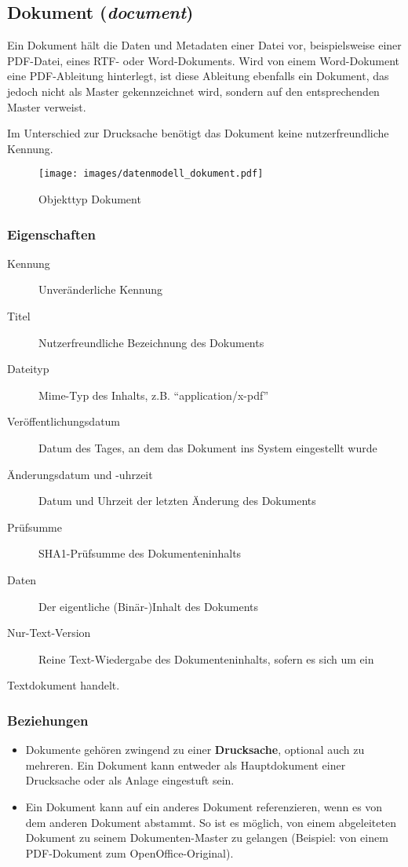 \documentclass[,a4paper]{article}
\makeatletter
\def\maxwidth{\ifdim\Gin@nat@width>\linewidth\linewidth
\else\Gin@nat@width\fi}
\let\Oldincludegraphics\includegraphics
\renewcommand{\includegraphics}[1]{\Oldincludegraphics[width=\maxwidth]{#1}}
\makeatother
\begin{document}
\subsection{Dokument (\emph{document})}

Ein Dokument hält die Daten und Metadaten einer Datei vor,
beispielsweise einer PDF-Datei, eines RTF- oder Word-Dokuments. Wird von
einem Word-Dokument eine PDF-Ableitung hinterlegt, ist diese Ableitung
ebenfalls ein Dokument, das jedoch nicht als Master gekennzeichnet wird,
sondern auf den entsprechenden Master verweist.

Im Unterschied zur Drucksache benötigt das Dokument keine
nutzerfreundliche Kennung.

\begin{figure}[htbp]
\centering
\texttt{[image: images/datenmodell\_dokument.pdf]}
\caption{Objekttyp Dokument}
\end{figure}

\subsubsection{Eigenschaften}

\begin{description}
\item[Kennung]
Unveränderliche Kennung
\item[Titel]
Nutzerfreundliche Bezeichnung des Dokuments
\item[Dateityp]
Mime-Typ des Inhalts, z.B. ``application/x-pdf''
\item[Veröffentlichungsdatum]
Datum des Tages, an dem das Dokument ins System eingestellt wurde
\item[Änderungsdatum und -uhrzeit]
Datum und Uhrzeit der letzten Änderung des Dokuments
\item[Prüfsumme]
SHA1-Prüfsumme des Dokumenteninhalts
\item[Daten]
Der eigentliche (Binär-)Inhalt des Dokuments
\item[Nur-Text-Version]
Reine Text-Wiedergabe des Dokumenteninhalts, sofern es sich um ein
\end{description}

Textdokument handelt.

\subsubsection{Beziehungen}

\begin{itemize}
\item
  Dokumente gehören zwingend zu einer \textbf{Drucksache}, optional auch
  zu mehreren. Ein Dokument kann entweder als Hauptdokument einer
  Drucksache oder als Anlage eingestuft sein.
\item
  Ein Dokument kann auf ein anderes Dokument referenzieren, wenn es von
  dem anderen Dokument abstammt. So ist es möglich, von einem
  abgeleiteten Dokument zu seinem Dokumenten-Master zu gelangen
  (Beispiel: von einem PDF-Dokument zum OpenOffice-Original).
\end{itemize}
\end{document}
